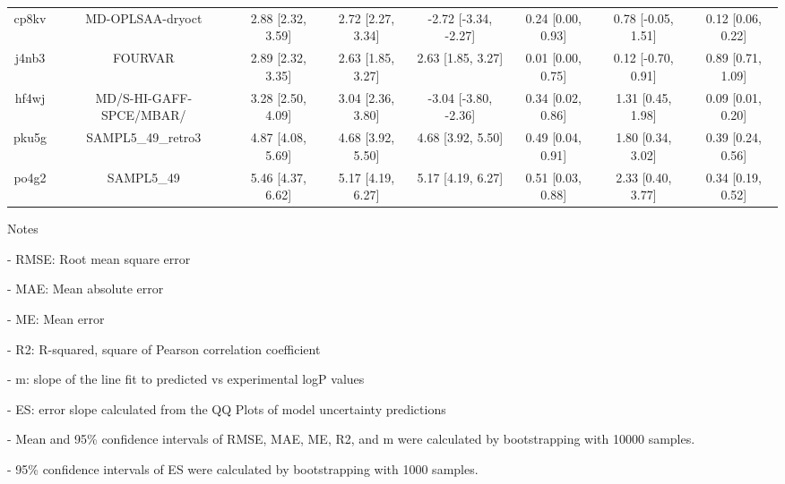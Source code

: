 \documentclass{article}
\begin{document}
\begin{center}
\begin{longtable}{|cccccccc|}
 cp8kv &                                   MD-OPLSAA-dryoct &  2.88 [2.32, 3.59] &  2.72 [2.27, 3.34] &  -2.72 [-3.34, -2.27] &  0.24 [0.00, 0.93] &   0.78 [-0.05, 1.51] &     0.12 [0.06, 0.22] \\
 j4nb3 &                                            FOURVAR &  2.89 [2.32, 3.35] &  2.63 [1.85, 3.27] &     2.63 [1.85, 3.27] &  0.01 [0.00, 0.75] &   0.12 [-0.70, 0.91] &     0.89 [0.71, 1.09] \\
 hf4wj &                            MD/S-HI-GAFF-SPCE/MBAR/ &  3.28 [2.50, 4.09] &  3.04 [2.36, 3.80] &  -3.04 [-3.80, -2.36] &  0.34 [0.02, 0.86] &    1.31 [0.45, 1.98] &     0.09 [0.01, 0.20] \\
 pku5g &                                 SAMPL5\_49\_retro3 &  4.87 [4.08, 5.69] &  4.68 [3.92, 5.50] &     4.68 [3.92, 5.50] &  0.49 [0.04, 0.91] &    1.80 [0.34, 3.02] &     0.39 [0.24, 0.56] \\
 po4g2 &                                         SAMPL5\_49 &  5.46 [4.37, 6.62] &  5.17 [4.19, 6.27] &     5.17 [4.19, 6.27] &  0.51 [0.03, 0.88] &    2.33 [0.40, 3.77] &     0.34 [0.19, 0.52] \\
\end{longtable}
\end{center}

Notes

- RMSE: Root mean square error

- MAE: Mean absolute error

- ME: Mean error

- R2: R-squared, square of Pearson correlation coefficient

- m: slope of the line fit to predicted vs experimental logP values

- ES: error slope calculated from the QQ Plots of model uncertainty predictions

- Mean and 95\% confidence intervals of RMSE, MAE, ME, R2, and m were calculated by bootstrapping with 10000 samples.

- 95\% confidence intervals of ES were calculated by bootstrapping with 1000 samples.\end{document}
\end{document}
